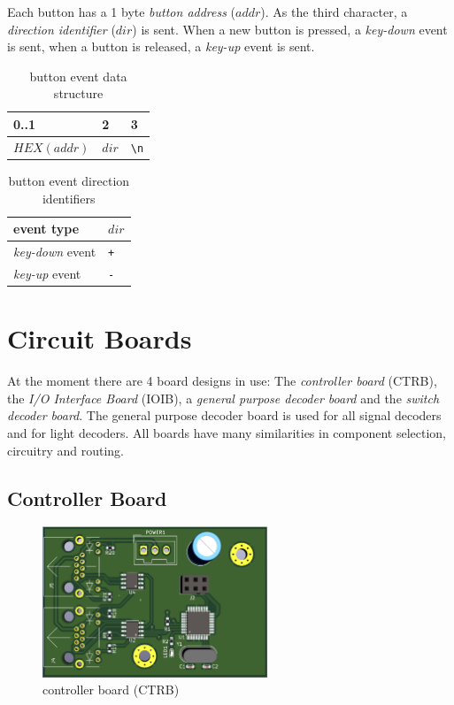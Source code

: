 \documentclass{scrreprt}
\begin{document}
Each button has a 1 byte \emph{button address} ($addr$).
As the third character, a \emph{direction identifier} ($dir$) is sent.
When a new button is pressed, a \emph{key-down} event is sent, when a button is released, a \emph{key-up} event is sent.

\begin{table}[h!]
\centering
\begin{tabular}{ |l|l|l| } 
\multicolumn{1}{l}{0..1} & \multicolumn{1}{l}{2} & \multicolumn{1}{l}{3} \\ \hline
$HEX(addr)$ & $dir$ & \texttt{\textbackslash{}n} \\\hline
\end{tabular}
\caption{button event data structure}
\end{table}
\begin{table}[h!]
\centering
\begin{tabular}{ |l|l| } 
\hline
event type     & $dir$ \\\hline\hline
\emph{key-down} event & \texttt{+} \\\hline
\emph{key-up} event   & \texttt{-} \\\hline
\end{tabular}
\caption{button event direction identifiers}
\end{table}

\chapter{Circuit Boards}
At the moment there are 4 board designs in use:
The \emph{controller board} (CTRB), the \emph{I/O Interface Board} (IOIB), a \emph{general purpose decoder board} and the \emph{switch decoder board}.
The general purpose decoder board is used for all signal decoders and for light decoders.
All boards have many similarities in component selection, circuitry and routing.

\section{Controller Board}
\begin{figure}[h!]
    \centering
    \includegraphics[width=0.6\textwidth]{controller}
    \caption{controller board (CTRB)}
    \label{fig:ctrb}
\end{figure}
\end{document}
